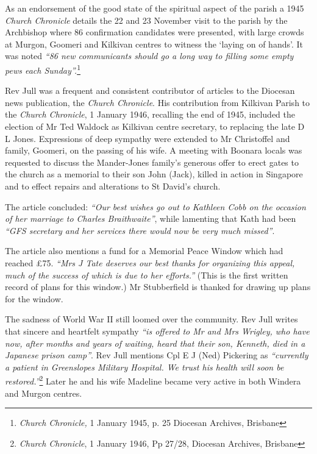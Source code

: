 As an endorsement of the good state of the spiritual aspect of the parish a 1945 \emph{Church Chronicle} details the 22 and 23 November visit to the parish by the Archbishop where 86 confirmation candidates were presented, with large crowds at Murgon, Goomeri and Kilkivan centres to witness the `laying on of hands'. It was noted \emph{``86 new communicants should go a long way to filling some empty pews each Sunday''.}\footnote{\emph{Church Chronicle,} 1 January 1945, p. 25 Diocesan Archives, Brisbane}


Rev Jull was a frequent and consistent contributor of articles to the Diocesan news publication, the \emph{Church Chronicle}. His contribution from Kilkivan Parish to the \emph{Church Chronicle}, 1 January 1946, recalling the end of 1945, included the election of Mr Ted Waldock as Kilkivan centre secretary, to replacing the late D L Jones. Expressions of deep sympathy were extended to Mr Christoffel and family, Goomeri, on the passing of his wife. A meeting with Boonara locals was requested to discuss the Mander-Jones family's generous offer to erect gates to the church as a memorial to their son John (Jack), killed in action in Singapore and to effect repairs and alterations to St David's church.



The article concluded: \emph{``Our best wishes go out to Kathleen Cobb on the occasion of her marriage to Charles Braithwaite''}, while lamenting that Kath had been \emph{``GFS secretary and her services there would now be very much missed''}.



The article also mentions a fund for a Memorial Peace Window which had reached \pounds75. \emph{``Mrs J Tate deserves our best thanks for organizing this appeal, much of the success of which is due to her efforts.''} (This is the first written record of plans for this window.) Mr Stubberfield is thanked for drawing up plans for the window.



The sadness of World War II still loomed over the community. Rev Jull writes that sincere and heartfelt sympathy \emph{``is offered to Mr and Mrs Wrigley, who have now, after months and years of waiting, heard that their son, Kenneth, died in a Japanese prison camp''}. Rev Jull mentions Cpl E J (Ned) Pickering as \emph{``currently a patient in Greenslopes Military Hospital. We trust his health will soon be restored.''}\footnote{\emph{Church Chronicle}, 1 January 1946, Pp 27/28, Diocesan Archives, Brisbane} Later he and his wife Madeline became very active in both Windera and Murgon centres.


